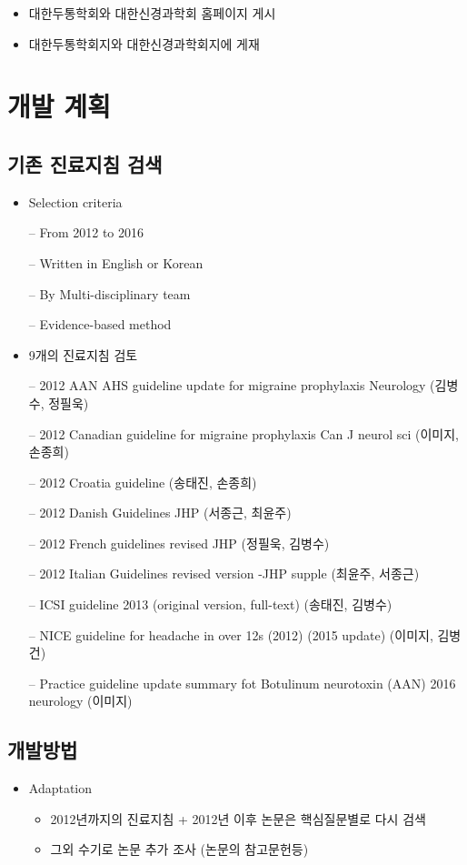 \documentclass[]{book}
\providecommand{\tightlist}{%
  \setlength{\itemsep}{0pt}\setlength{\parskip}{0pt}}
\begin{document}
\begin{itemize}
\tightlist
\item
  대한두통학회와 대한신경과학회 홈페이지 게시
\item
  대한두통학회지와 대한신경과학회지에 게재
\end{itemize}

\hypertarget{section-11}{%
\chapter{개발 계획}\label{section-11}}

\hypertarget{section-12}{%
\section{기존 진료지침 검색}\label{section-12}}

\begin{itemize}
\item
  Selection criteria

  -- From 2012 to 2016

  -- Written in English or Korean

  -- By Multi-disciplinary team

  -- Evidence-based method
\item
  9개의 진료지침 검토

  -- 2012 AAN AHS guideline update for migraine prophylaxis Neurology (김병수, 정필욱)

  -- 2012 Canadian guideline for migraine prophylaxis Can J neurol sci (이미지, 손종희)

  -- 2012 Croatia guideline (송태진, 손종희)

  -- 2012 Danish Guidelines JHP (서종근, 최윤주)

  -- 2012 French guidelines revised JHP (정필욱, 김병수)

  -- 2012 Italian Guidelines revised version -JHP supple (최윤주, 서종근)

  -- ICSI guideline 2013 (original version, full-text) (송태진, 김병수)

  -- NICE guideline for headache in over 12s (2012) (2015 update) (이미지, 김병건)

  -- Practice guideline update summary fot Botulinum neurotoxin (AAN) 2016 neurology (이미지)
\end{itemize}

\hypertarget{section-13}{%
\section{개발방법}\label{section-13}}

\begin{itemize}
\item
  Adaptation

  \begin{itemize}
  \item
    2012년까지의 진료지침 + 2012년 이후 논문은 핵심질문별로 다시 검색
  \item
    그외 수기로 논문 추가 조사 (논문의 참고문헌등)
  \end{itemize}
\end{itemize}


\end{document}
